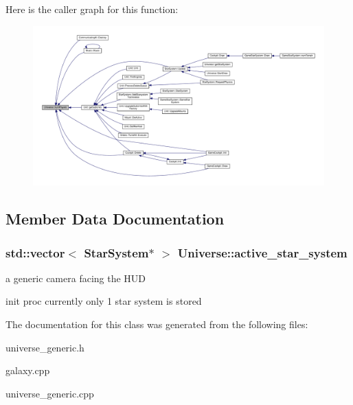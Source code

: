 Here is the caller graph for this function\+:
\nopagebreak
\begin{figure}[H]
\begin{center}
\leavevmode
\includegraphics[width=350pt]{dc/dce/classUniverse_a7ee0f80ac31698ac9bf4fba5dbff0367_icgraph}
\end{center}
\end{figure}




\subsection{Member Data Documentation}
\subsubsection[{\texorpdfstring{active\+\_\+star\+\_\+system}{active_star_system}}]{\setlength{\rightskip}{0pt plus 5cm}std\+::vector$<$ {\bf Star\+System}$\ast$ $>$ Universe\+::active\+\_\+star\+\_\+system\hspace{0.3cm}{\ttfamily [protected]}}\hypertarget{classUniverse_a892535cda03f92e53397feaab2379042}{}\label{classUniverse_a892535cda03f92e53397feaab2379042}


a generic camera facing the H\+UD 

init proc currently only 1 star system is stored 

The documentation for this class was generated from the following files\+:\begin{DoxyCompactItemize}
\item 
universe\+\_\+generic.\+h\item 
galaxy.\+cpp\item 
universe\+\_\+generic.\+cpp\end{DoxyCompactItemize}
